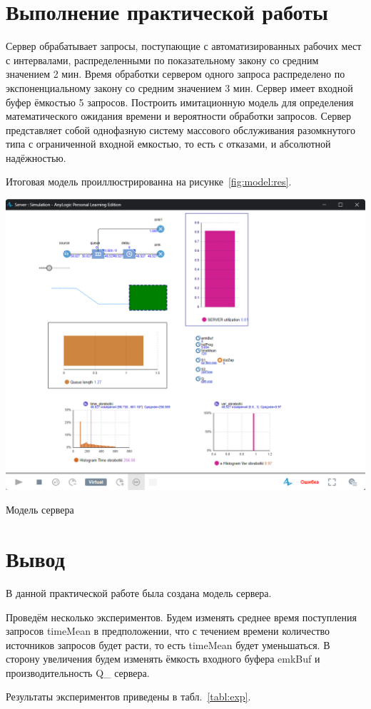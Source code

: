 \graphicspath{{./img}} %

\section*{Выполнение практической работы}
Сервер обрабатывает запросы, поступающие с автоматизированных рабочих мест
с интервалами, распределенными по показательному закону со средним
значением 2 мин. Время обработки
сервером одного запроса распределено по экспоненциальному закону со
средним значением 3 мин. Сервер имеет входной буфер ёмкостью 5 запросов.
Построить имитационную модель для определения математического ожидания
времени и вероятности обработки запросов.
Сервер представляет собой однофазную систему массового обслуживания
разомкнутого типа с ограниченной входной емкостью,
то есть с отказами, и абсолютной надёжностью.\par
Итоговая модель проиллюстрированна на рисунке~\ref{fig:model:res}.

\begin{image}
	\includegraphics[width=1\textwidth]{2023-05-06_18-02-40}
	\caption{Модель сервера}
	\label{fig:model:res}
\end{image}

\clearpage

\section*{\LARGE Вывод}
В данной практической работе была создана модель сервера.\par
Проведём несколько экспериментов. Будем изменять среднее
время поступления запросов timeMean в предположении, что с течением времени
количество источников запросов будет расти, то
есть timeMean будет уменьшаться. В сторону увеличения будем
изменять ёмкость входного буфера emkBuf и производительность Q\_ сервера.\par
Результаты экспериментов приведены в табл.~\ref{tabl:exp}.

